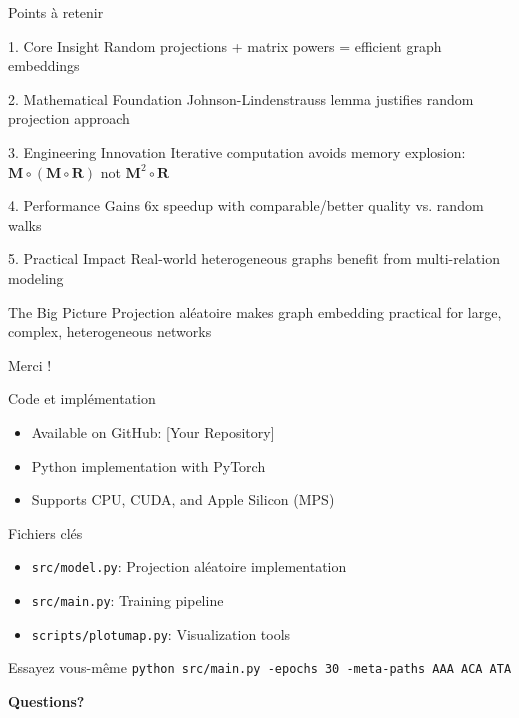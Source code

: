\documentclass[9pt,aspectratio=169,professionalfonts]{beamer}
\begin{document}
\begin{frame}{Points à retenir}
\begin{block}{1. Core Insight}
Random projections + matrix powers = efficient graph embeddings
\end{block}

\begin{block}{2. Mathematical Foundation}
Johnson-Lindenstrauss lemma justifies random projection approach
\end{block}

\begin{block}{3. Engineering Innovation}
Iterative computation avoids memory explosion: $\mathbf{M} \circ (\mathbf{M} \circ \mathbf{R})$ not $\mathbf{M}^2 \circ \mathbf{R}$
\end{block}

\begin{block}{4. Performance Gains}
6x speedup with comparable/better quality vs. random walks
\end{block}

\begin{block}{5. Practical Impact}
Real-world heterogeneous graphs benefit from multi-relation modeling
\end{block}

\begin{alertblock}{The Big Picture}
Projection aléatoire makes graph embedding practical for large, complex, heterogeneous networks
\end{alertblock}
\end{frame}

\begin{frame}{Merci !}
\begin{block}{Code et implémentation}
\begin{itemize}
    \item Available on GitHub: [Your Repository]
    \item Python implementation with PyTorch
    \item Supports CPU, CUDA, and Apple Silicon (MPS)
\end{itemize}
\end{block}

\begin{block}{Fichiers clés}
\begin{itemize}
    \item \texttt{src/model.py}: Projection aléatoire implementation
    \item \texttt{src/main.py}: Training pipeline
    \item \texttt{scripts/plot\textunderscore umap.py}: Visualization tools
\end{itemize}
\end{block}

\begin{block}{Essayez vous-même}
\texttt{python src/main.py -epochs 30 -meta-paths AAA ACA ATA}
\end{block}

\begin{center}
\Huge \textbf{Questions?}
\end{center}
\end{frame}
\end{document}
